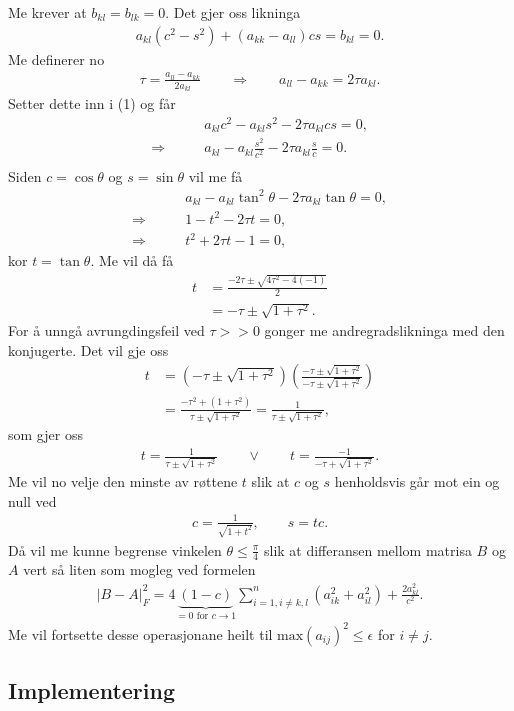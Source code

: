 \documentclass[11pt, a4paper]{article}
\begin{document}
    Me krever at $b_{kl} = b_{lk} = 0$. Det gjer oss likninga
    \begin{align}
      a_{kl}(c^2 - s^2) + (a_{kk} - a_{ll})cs = b_{kl} = 0.
    \end{align}
    Me definerer no 
    \begin{align*}
      \tau = \frac{a_{ll} - a_{kk}}{2a_{kl}} \qquad \Rightarrow \qquad a_{ll} - a_{kk} = 2\tau a_{kl}.
    \end{align*}
    Setter dette inn i (1) og får
    \begin{align*}
      &a_{kl}c^2 - a_{kl}s^2 - 2\tau a_{kl}cs = 0, \\
      \Rightarrow \qquad &a_{kl} - a_{kl}\frac{s^2}{c^2} - 2\tau a_{kl}\frac{s}{c} = 0. \\
    \end{align*}
    Siden $c = \cos{\theta}$ og $s = \sin{\theta}$ vil me få 
    \begin{align*}
      &a_{kl} - a_{kl}\tan^2{\theta} - 2\tau a_{kl} \tan{\theta} = 0, \\
      \Rightarrow \qquad &1 - t^2 - 2\tau t = 0, \\
      \Rightarrow \qquad &t^2 + 2\tau t - 1 = 0,
    \end{align*}
    kor $t = \tan{\theta}$. Me vil då få 
    \begin{align*}
      t &= \frac{-2\tau \pm \sqrt{4\tau^2 - 4(-1)}}{2} \\
      &= -\tau \pm \sqrt{1 + \tau^2}.
    \end{align*}
    For å unngå avrungdingsfeil ved $\tau >> 0$ gonger me andregradslikninga med den konjugerte. Det vil gje oss
    \begin{align*}
      t &= \left( -\tau \pm \sqrt{1 + \tau^2} \right)\left( \frac{-\tau \pm \sqrt{1 + \tau^2}}{-\tau \pm \sqrt{1 + \tau^2}} \right) \\
      &= \frac{-\tau^2 + (1 + \tau^2)}{\tau \pm \sqrt{1 + \tau^2}} = \frac{1}{\tau \pm \sqrt{1 + \tau^2}},
    \end{align*}
    som gjer oss
    \begin{align*}
      t = \frac{1}{\tau \pm \sqrt{1 + \tau^2}} \qquad \lor \qquad t = \frac{-1}{-\tau + \sqrt{1 + \tau^2}}.
    \end{align*}
    Me vil no velje den minste av røttene $t$ slik at $c$ og $s$ henholdsvis går mot ein og null ved
    \begin{align*}
      c = \frac{1}{\sqrt{1 + t^2}}, \qquad s = tc.
    \end{align*}
    Då vil me kunne begrense vinkelen $\theta \leq \frac{\pi}{4}$ slik at differansen mellom matrisa $B$ og $A$ vert så liten som mogleg ved formelen
    \begin{align*}
      \lvert B - A \rvert_F^2 = 4\underbrace{(1 - c)}_{= 0 \text{ for } c \to 1}\sum_{i = 1, i\ne k, l}^n(a_{ik}^2 + a_{il}^2) + \frac{2a_{kl}^2}{c^2}.
    \end{align*}
    Me vil fortsette desse operasjonane heilt til $\text{max}(a_{ij})^2 \leq \epsilon$ for $i \ne j$.

  \subsection{Implementering}
\end{document}
